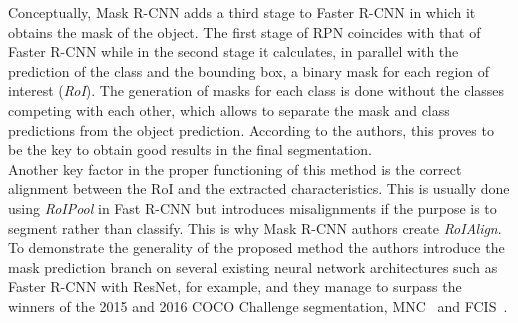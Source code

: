 Conceptually, Mask R-CNN adds a third stage to Faster R-CNN in which it obtains the mask of the object. The first stage of RPN coincides with that of Faster R-CNN while in the second stage it calculates, in parallel with the prediction of the class and the bounding box, a binary mask for each region of interest (\textit{RoI}). The generation of masks for each class is done without the classes competing with each other, which allows to separate the mask and class predictions from the object prediction. According to the authors, this proves to be the key to obtain good results in the final segmentation.\\ 
Another key factor in the proper functioning of this method is the correct alignment between the RoI and the extracted characteristics. This is usually done using \textit{RoIPool} in Fast R-CNN but introduces misalignments if the purpose is to segment rather than classify. This is why Mask R-CNN authors create \textit{RoIAlign}. To demonstrate the generality of the proposed method the authors introduce the mask prediction branch on several existing neural network architectures such as Faster R-CNN with ResNet, for example, and they manage to surpass the winners of the 2015 and 2016 COCO Challenge segmentation, MNC~\cite{dai2016instance} and FCIS~\cite{li2016fully}.\\
